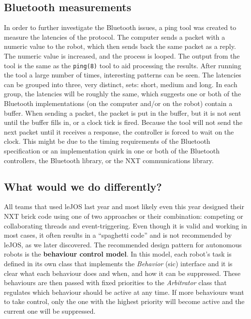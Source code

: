 \subsection{Bluetooth measurements}
In order to further investigate the Bluetooth issues, a ping tool was created to measure 
the latencies of the protocol. The computer sends a packet with a numeric value to the 
robot, which then sends back the same packet as a reply. The numeric value is increased, 
and the process is looped. The output from the tool is the same as the \texttt{ping(8)} 
tool to aid processing the results. After running the tool a large number of times, 
interesting patterns can be seen. The latencies can be grouped into three, very distinct, 
sets: short, medium and long. In each group, the latencies will be roughly the same, 
which suggests one or both of the Bluetooth implementations (on the computer and/or on 
the robot) contain a buffer. When sending a packet, the packet is put in the buffer, but 
it is not sent until the buffer fills in, or a clock tick is fired. Because the tool will 
not send the next packet until it receives a response, the controller is forced to wait 
on the clock. This might be due to the timing requirements of the Bluetooth specification 
or an implementation quirk in one or both of the Bluetooth controllers, the Bluetooth 
library, or the NXT communications library.

\subsection{What would we do differently?}
All teams that used leJOS last year and most likely even this year designed their NXT brick 
code using one of two approaches or their combination: competing or collaborating threads 
and event-triggering. Even though it is valid and working in most cases, it often results in 
a ``spaghetti code'' and is not recommended by leJOS, as we later discovered. The 
recommended design pattern for autonomous robots is the 
\textbf{behaviour control model}\cite{behaviour}. In this model, each robot's task is defined 
in its own class that implements the \textsl{Behavior} (sic) interface and it is clear what 
each behaviour does and when, and how it can be suppressed. These behaviours are then passed 
with fixed priorities to the \textsl{Arbitrator} class that regulates which behaviour should 
be active at any time. If more behaviours want to take control, only the one 
with the highest priority will become active and the current one will be suppressed.

